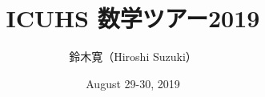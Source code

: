 \documentclass[10pt, dvipdfmx]{beamer}
\title[ICUHS 数学ツアー2019]{ICUHS 数学ツアー2019 }
\author[H. Suzuki]{鈴木寛（Hiroshi Suzuki）}            %
\institute[ICU]{国際基督教大学（International Christian University）}  %
\date[2019/8/29-30]{August 29-30, 2019}
\begin{document}
\begin{frame}
\titlepage                    %
\end{frame}
%

%
%
%
%
%
\end{document}

